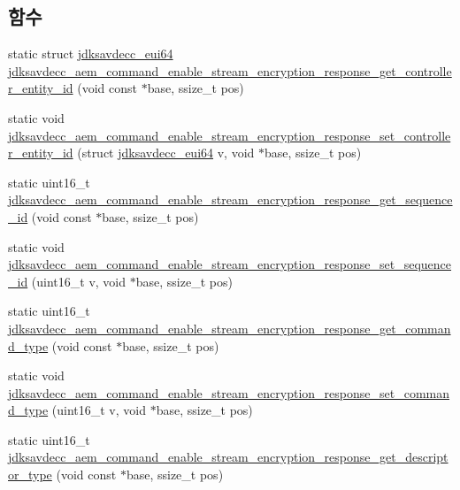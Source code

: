 \subsection*{함수}
\begin{DoxyCompactItemize}
\item 
static struct \hyperlink{structjdksavdecc__eui64}{jdksavdecc\+\_\+eui64} \hyperlink{group__command__enable__stream__encryption__response_gaebdcb804382033ebae1da7d238c51de0}{jdksavdecc\+\_\+aem\+\_\+command\+\_\+enable\+\_\+stream\+\_\+encryption\+\_\+response\+\_\+get\+\_\+controller\+\_\+entity\+\_\+id} (void const $\ast$base, ssize\+\_\+t pos)
\item 
static void \hyperlink{group__command__enable__stream__encryption__response_ga719fd8ba441b60b828be8b79fc62633a}{jdksavdecc\+\_\+aem\+\_\+command\+\_\+enable\+\_\+stream\+\_\+encryption\+\_\+response\+\_\+set\+\_\+controller\+\_\+entity\+\_\+id} (struct \hyperlink{structjdksavdecc__eui64}{jdksavdecc\+\_\+eui64} v, void $\ast$base, ssize\+\_\+t pos)
\item 
static uint16\+\_\+t \hyperlink{group__command__enable__stream__encryption__response_ga17e0e058079e9ffa05acecfa97ed6511}{jdksavdecc\+\_\+aem\+\_\+command\+\_\+enable\+\_\+stream\+\_\+encryption\+\_\+response\+\_\+get\+\_\+sequence\+\_\+id} (void const $\ast$base, ssize\+\_\+t pos)
\item 
static void \hyperlink{group__command__enable__stream__encryption__response_gab43f78f66c6fdecbd805e7248f352634}{jdksavdecc\+\_\+aem\+\_\+command\+\_\+enable\+\_\+stream\+\_\+encryption\+\_\+response\+\_\+set\+\_\+sequence\+\_\+id} (uint16\+\_\+t v, void $\ast$base, ssize\+\_\+t pos)
\item 
static uint16\+\_\+t \hyperlink{group__command__enable__stream__encryption__response_ga88a79b98b344a2d1cd1bcdacc04a4fb7}{jdksavdecc\+\_\+aem\+\_\+command\+\_\+enable\+\_\+stream\+\_\+encryption\+\_\+response\+\_\+get\+\_\+command\+\_\+type} (void const $\ast$base, ssize\+\_\+t pos)
\item 
static void \hyperlink{group__command__enable__stream__encryption__response_gaf053010146adb52f08847358caca3dad}{jdksavdecc\+\_\+aem\+\_\+command\+\_\+enable\+\_\+stream\+\_\+encryption\+\_\+response\+\_\+set\+\_\+command\+\_\+type} (uint16\+\_\+t v, void $\ast$base, ssize\+\_\+t pos)
\item 
static uint16\+\_\+t \hyperlink{group__command__enable__stream__encryption__response_ga681542713a13d9124af2ddbd9d4cb9ff}{jdksavdecc\+\_\+aem\+\_\+command\+\_\+enable\+\_\+stream\+\_\+encryption\+\_\+response\+\_\+get\+\_\+descriptor\+\_\+type} (void const $\ast$base, ssize\+\_\+t pos)

\end{DoxyCompactItemize}
